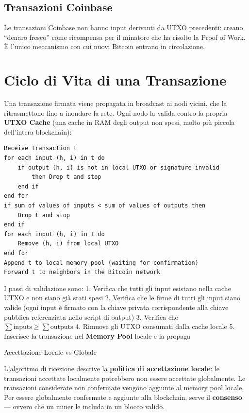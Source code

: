 \documentclass[
  italian,
  openany]{book}
\begin{document}
\subsection{Transazioni Coinbase}\label{transazioni-coinbase}

Le transazioni Coinbase non hanno input derivanti da UTXO precedenti:
creano ``denaro fresco'' come ricompensa per il minatore che ha risolto
la Proof of Work. È l'unico meccanismo con cui nuovi Bitcoin entrano in
circolazione.

\section{Ciclo di Vita di una
Transazione}\label{ciclo-di-vita-di-una-transazione}

Una transazione firmata viene propagata in broadcast ai nodi vicini, che
la ritrasmettono fino a inondare la rete. Ogni nodo la valida contro la
propria \textbf{UTXO Cache} (una cache in RAM degli output non spesi,
molto più piccola dell'intera blockchain):

\begin{verbatim}
Receive transaction t
for each input (h, i) in t do
    if output (h, i) is not in local UTXO or signature invalid
        then Drop t and stop
    end if
end for
if sum of values of inputs < sum of values of outputs then
    Drop t and stop
end if
for each input (h, i) in t do
    Remove (h, i) from local UTXO
end for
Append t to local memory pool (waiting for confirmation)
Forward t to neighbors in the Bitcoin network
\end{verbatim}

I passi di validazione sono: 1. Verifica che tutti gli input esistano
nella cache UTXO e non siano già stati spesi 2. Verifica che le firme di
tutti gli input siano valide (ogni input è firmato con la chiave privata
corrispondente alla chiave pubblica referenziata nello script di output)
3. Verifica che \(\sum \text{inputs} \geq \sum \text{outputs}\) 4.
Rimuove gli UTXO consumati dalla cache locale 5. Inserisce la
transazione nel \textbf{Memory Pool} locale e la propaga

\begin{calloutwarning}{Accettazione Locale vs Globale}

L'algoritmo di ricezione descrive la \textbf{politica di accettazione
locale}: le transazioni accettate localmente potrebbero non essere
accettate globalmente. Le transazioni considerate non confermate vengono
aggiunte al memory pool locale. Per essere globalmente confermate e
aggiunte alla blockchain, serve il \textbf{consenso} --- ovvero che un
miner le includa in un blocco valido.

\end{calloutwarning}
\end{document}
